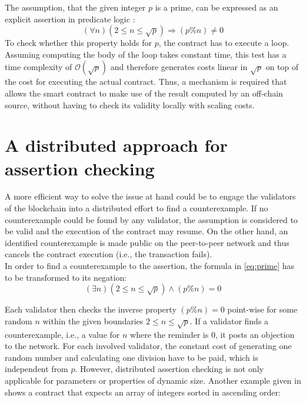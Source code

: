 The assumption, that the given integer $p$ is a prime, can be expressed as an explicit assertion in predicate logic \cite{thiemann_2020}: 
\begin{equation}\label{eq:prime}
    (\forall n) (2 \le n \le \sqrt{p}) \Rightarrow (p \% n) \neq 0
\end{equation}
To check whether this property holds for $p$, the contract has to execute a loop. Assuming computing the body of the loop takes constant time, this test has a time complexity of $\mathcal{O}(\sqrt{p})$ and therefore generates costs linear in $\sqrt{p}$ on top of the cost for executing the actual contract. Thus, a mechanism is required that allows the smart contract to make use of the result computed by an off-chain source, without having to check its validity locally with scaling costs.

\section{A distributed approach for assertion checking}
A more efficient way to solve the issue at hand could be to engage the validators of the blockchain into a distributed effort to find a counterexample. If no counterexample could be found by any validator, the assumption is considered to be valid and the execution of the contract may resume. On the other hand, an identified counterexample is made public on the peer-to-peer network and thus cancels the contract execution (i.e., the transaction fails). \\
In order to find a counterexample to the assertion, the formula in \eqref{eq:prime} has to be transformed to its negation:
\begin{equation}\label{eq:prime_neg}
	(\exists n) (2 \le n \le \sqrt{p}) \wedge (p \% n) = 0
\end{equation}

Each validator then checks the inverse property $(p \% n) = 0$ point-wise for some random $n$ within the given boundaries $2 \le n \le \sqrt{p}$. If a validator finds a counterexample, i.e., a value for $n$ where the reminder is $0$, it posts an objection to the network. For each involved validator, the constant cost of generating one random number and calculating one division have to be paid, which is independent from $p$. %
However, distributed assertion checking is not only applicable for parameters or properties of dynamic size. Another example given in \cite{thiemann_2020} shows a contract that expects an array of integers sorted in ascending order: 

